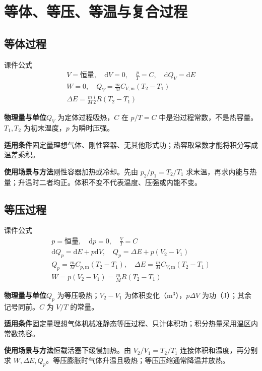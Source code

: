 \documentclass[UTF8,fontset=none,zihao=-4,a4paper]{ctexart}
\newcommand{\chapterpage}[1]{\clearpage\section{#1}}
\newcommand{\explain}[3]{\par\noindent\textbf{物理量与单位}\quad #1\par
\noindent\textbf{适用条件}\quad #2\par
\noindent\textbf{使用场景与方法}\quad #3\par}
\begin{document}
\chapterpage{等体、等压、等温与复合过程}
\par\noindent\begin{minipage}{\linewidth}
\subsection{等体过程}
\begin{infobox}[breakable=false]{课件公式}
\begin{gather*}V=\text{恒量},\quad\mathrm dV=0,\quad\frac pT=C,\quad\mathrm dQ_V=\mathrm dE\\W=0,\quad Q_V=\frac mM C_{V,\mathrm m}(T_2-T_1)\\\Delta E=\frac mM\frac i2R(T_2-T_1)\end{gather*}
\end{infobox}
\end{minipage}\par
\explain{$Q_V$ 为定体过程吸热，$C$ 在 $p/T=C$ 中是沿过程常数，不是热容量。$T_1,T_2$ 为初末温度，$p$ 为瞬时压强。}{固定量理想气体、刚性容器、无其他形式功；热容取常数才能将积分写成温差乘积。}{刚性容器加热或冷却。先由 $p_2/p_1=T_2/T_1$ 求末温，再求内能与热量；升温时二者均正。体积不变不代表温度、压强或内能不变。}


\par\noindent\begin{minipage}{\linewidth}
\subsection{等压过程}
\begin{infobox}[breakable=false]{课件公式}
\begin{gather*}p=\text{恒量},\quad\mathrm dp=0,\quad\frac VT=C\\\mathrm dQ_p=\mathrm dE+p\mathrm dV,\quad Q_p=\Delta E+p(V_2-V_1)\\Q_p=\frac mM C_{p,\mathrm m}(T_2-T_1),\quad\Delta E=\frac mM C_{V,\mathrm m}(T_2-T_1)\\W=p(V_2-V_1)=\frac mM R(T_2-T_1)\end{gather*}
\end{infobox}
\end{minipage}\par
\explain{$Q_p$ 为等压吸热；$V_2-V_1$ 为体积变化（$\mathrm m^3$），$p\Delta V$ 为功（J）；其余记号同前。$C$ 为 $V/T$ 的常量。}{固定量理想气体机械准静态等压过程、只计体积功；积分热量采用温区内常数热容。}{恒载活塞下缓慢加热。由 $V_2/V_1=T_2/T_1$ 连接体积和温度，再分别求 $W,\Delta E,Q_p$。等压膨胀时气体升温且吸热；等压压缩通常降温并放热。}
\end{document}

